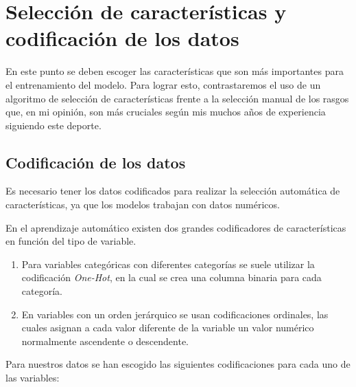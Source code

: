 \section{Selección de características y codificación de los datos}

En este punto se deben escoger las características que son más importantes para el entrenamiento del modelo. Para lograr esto, contrastaremos el uso de un algoritmo de selección de características frente a la selección manual de los rasgos que, en mi opinión, son más cruciales según mis muchos años de experiencia siguiendo este deporte. 

\subsection{Codificación de los datos}

Es necesario tener los datos codificados para realizar la selección automática de características, ya que los modelos trabajan con datos numéricos.

En el aprendizaje automático existen dos grandes codificadores de características en función del tipo de variable. 
\begin{enumerate} 
    \item Para variables categóricas con diferentes categorías se suele utilizar la codificación \textit{One-Hot}, en la cual se crea una columna binaria para cada categoría.
    \item En variables con un orden jerárquico se usan codificaciones ordinales, las cuales asignan a cada valor diferente de la variable un valor numérico normalmente ascendente o descendente.
\end{enumerate}

Para nuestros datos se han escogido las siguientes codificaciones para cada uno de las variables:

